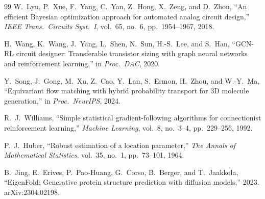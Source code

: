 \documentclass[conference]{IEEEtran}
\begin{document}
\begin{thebibliography}{99}
W.~Lyu, P.~Xue, F.~Yang, C.~Yan, Z.~Hong, X.~Zeng, and D.~Zhou,
``An efficient Bayesian optimization approach for automated analog
circuit design,'' \emph{IEEE Trans.\ Circuits Syst.\ I}, vol.~65,
no.~6, pp.~1954--1967, 2018.

H.~Wang, K.~Wang, J.~Yang, L.~Shen, N.~Sun, H.-S.~Lee, and S.~Han,
``{GCN-RL} circuit designer: Transferable transistor sizing with
graph neural networks and reinforcement learning,'' in \emph{Proc.\
DAC}, 2020.

Y.~Song, J.~Gong, M.~Xu, Z.~Cao, Y.~Lan, S.~Ermon, H.~Zhou,
and W.-Y.~Ma,
``Equivariant flow matching with hybrid probability transport for
3D molecule generation,'' in \emph{Proc.\ NeurIPS}, 2024.

R.~J.~Williams,
``Simple statistical gradient-following algorithms for connectionist
reinforcement learning,'' \emph{Machine Learning}, vol.~8,
no.~3--4, pp.~229--256, 1992.

P.~J.~Huber,
``Robust estimation of a location parameter,''
\emph{The Annals of Mathematical Statistics}, vol.~35, no.~1,
pp.~73--101, 1964.

B.~Jing, E.~Erives, P.~Pao-Huang, G.~Corso, B.~Berger, and T.~Jaakkola,
``EigenFold: Generative protein structure prediction with diffusion models,''
2023. arXiv:2304.02198.

\end{thebibliography}
\end{document}
